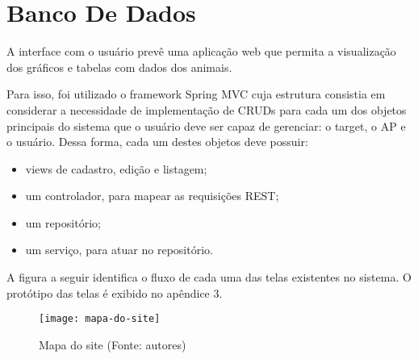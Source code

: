 \section{Banco De Dados}

A interface com o usuário prevê uma aplicação web que permita a visualização dos gráficos e tabelas com dados dos animais.

Para isso, foi utilizado o framework Spring MVC cuja estrutura consistia em considerar a necessidade de implementação de CRUDs para cada um dos objetos principais do sistema que o usuário deve ser capaz de gerenciar: o target, o AP e o usuário. Dessa forma, cada um destes objetos deve possuir:

\begin{itemize}
	\item views de cadastro, edição e listagem;
	\item um controlador, para mapear as requisições REST;
	\item um repositório;
	\item um serviço, para atuar no repositório.
\end{itemize}

A figura a seguir identifica o fluxo de cada uma das telas existentes no sistema. O protótipo das telas é exibido no apêndice 3.

\begin{figure}[ht]
  \centering
    \texttt{[image: mapa-do-site]}
  \caption{Mapa do site (Fonte: autores)}
\end{figure}
\FloatBarrier

